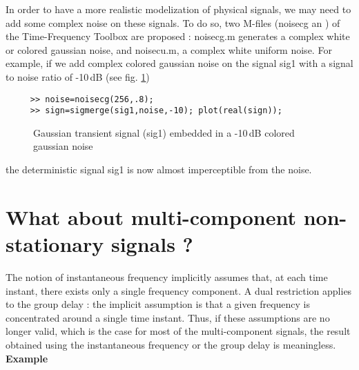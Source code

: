   In order to have a more realistic modelization of physical signals, we
may need to add some complex noise on these signals. To do so, two M-files
({\ttfamily noisecg} an ) of the Time-Frequency Toolbox are proposed :
{\ttfamily noisecg.m} generates a complex white or colored gaussian noise,
and {\ttfamily noisecu.m}, a complex white uniform noise. For example, if
we add complex colored gaussian noise on the signal {\ttfamily sig1} with a
signal to noise ratio of -10\,dB (see fig. \ref{Ns6fig4})
\begin{verbatim}
     >> noise=noisecg(256,.8);
     >> sign=sigmerge(sig1,noise,-10); plot(real(sign));
\end{verbatim}
\begin{figure}[htb]
\epsfxsize=10cm
\epsfysize=6cm
\centerline{}
\caption{\label{Ns6fig4}Gaussian transient signal ({\ttfamily sig1})
embedded in a -10\,dB colored gaussian noise} 
\end{figure}
the deterministic signal {\ttfamily sig1} is now almost imperceptible from
the noise.


\section{What about multi-component non-stationary signals ?}
  The notion of instantaneous frequency implicitly assumes that, at each
time instant, there exists only a single frequency component. A dual
restriction applies to the group delay : the implicit assumption is that a
given frequency is concentrated around a single time instant. Thus, if
these assumptions are no longer valid, which is the case for most of the
multi-component signals, the result obtained using the instantaneous
frequency or the group delay is meaningless.\\

  {\bf Example} 

